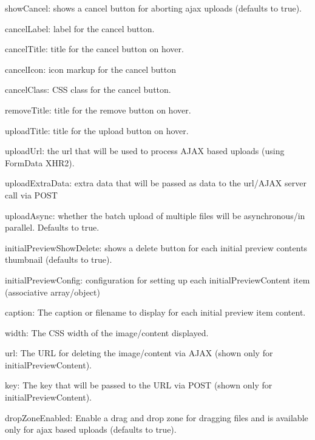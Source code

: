 \begin{DoxyItemize}
\item {\ttfamily show\+Cancel}\+: shows a cancel button for aborting ajax uploads (defaults to {\ttfamily true}).
\item {\ttfamily cancel\+Label}\+: label for the cancel button.
\item {\ttfamily cancel\+Title}\+: title for the cancel button on hover.
\item {\ttfamily cancel\+Icon}\+: icon markup for the cancel button
\item {\ttfamily cancel\+Class}\+: C\+SS class for the cancel button.
\item {\ttfamily remove\+Title}\+: title for the remove button on hover.
\item {\ttfamily upload\+Title}\+: title for the upload button on hover.
\item {\ttfamily upload\+Url}\+: the url that will be used to process A\+J\+AX based uploads (using Form\+Data X\+H\+R2).
\item {\ttfamily upload\+Extra\+Data}\+: extra data that will be passed as data to the url/\+A\+J\+AX server call via P\+O\+ST
\item {\ttfamily upload\+Async}\+: whether the batch upload of multiple files will be asynchronous/in parallel. Defaults to {\ttfamily true}.
\item {\ttfamily initial\+Preview\+Show\+Delete}\+: shows a delete button for each initial preview content\textquotesingle{}s thumbnail (defaults to {\ttfamily true}).
\item {\ttfamily initial\+Preview\+Config}\+: configuration for setting up each {\ttfamily initial\+Preview\+Content} item (associative array/object)
\begin{DoxyItemize}
\item {\ttfamily caption}\+: The caption or filename to display for each initial preview item content.
\item {\ttfamily width}\+: The C\+SS width of the image/content displayed.
\item {\ttfamily url}\+: The U\+RL for deleting the image/content via A\+J\+AX (shown only for {\ttfamily initial\+Preview\+Content}).
\item {\ttfamily key}\+: The key that will be passed to the U\+RL via P\+O\+ST (shown only for {\ttfamily initial\+Preview\+Content}).
\end{DoxyItemize}
\item {\ttfamily drop\+Zone\+Enabled}\+: Enable a drag and drop zone for dragging files and is available only for ajax based uploads (defaults to {\ttfamily true}).

\end{DoxyItemize}
